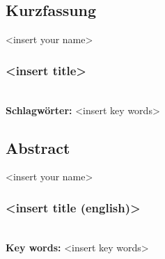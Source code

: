 
\subsection*{Kurzfassung}

<insert your name>
\subsubsection*{<insert title>}


%
\mbox{}\\[0.5\baselineskip]\noindent
\textbf{Schlagwörter:} 
<insert key words>
\clearpage
\subsection*{Abstract}

<insert your name>
\subsubsection*{<insert title (english)>}


%
\mbox{}\\[0.5\baselineskip]\noindent
\textbf{Key words:} 
<insert key words>
